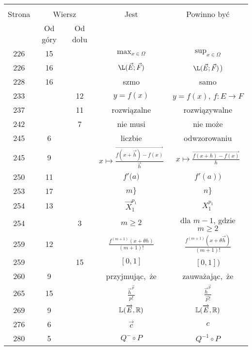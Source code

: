 \documentclass[a4paper,11pt]{article}
\begin{document}
\begin{center}

  \begin{tabular}{|c|c|c|c|c|}
    \hline
    & \multicolumn{2}{c|}{} & & \\
    Strona & \multicolumn{2}{c|}{Wiersz} & Jest
                              & Powinno być \\ \cline{2-3}
    & Od góry & Od dołu & & \\
    \hline
    226 & 15 & & $\max_{ x \in \Omega }$ & $\sup_{ x \in \Omega }$ \\
    226 & 16 & & $\L( \vec{ E }; \vec{ F } )$
           & $\L( \vec{ E }; \vec{ F } )$) \\
    228 & 16 & & szmo & samo \\
    233 & & 12 & $y = f( x )$ & $y = f( x )$, $f : E \to F$ \\
    237 & & 11 & rozwiązalne & rozwiązywalne \\
    242 & &  7 & nie musi & nie może \\
    245 &  6 & & liczbie & odwzorowaniu \\
    245 &  9 & & $x \mapsto
                 \frac{ \overrightarrow{ f( x + \vec{ h } ) - f( x ) } }{ \vec{ h } }$
           & $x \mapsto \frac{ \overrightarrow{ f( x + h ) - f( x ) } }{ h }$ \\
    250 & 11 & & $f'( a \Big)$ & $f'( a ) \Big)$ \\
    253 & 17 & & $m \}$ & $n \}$ \\
    254 & 13 & & $\vec{ X }^{ p_{ 1 } }_{ 1 }$ & $X^{ p_{ 1 } }_{ 1 }$ \\
    254 & &  3 & $m \geq 2$ & dla $m - 1$, gdzie $m \geq 2$ \\
    259 & 12 & & $\frac{ f^{ ( m + 1 ) }( x + \theta h ) }{ ( m + 1 )! }$
           & $\frac{ f^{ ( m + 1 ) }( x + \theta \vec{ h } ) }{ ( m + 1 )! }$
    \\
    259 & & 15 & $[ 0, 1 ]$ & $[ 0, 1 ]$) \\
    260 &  9 & & przyjmując,~że & zauważając,~że \\
    265 & 15 & & $\frac{ \vec{ h }^{ \vec{ p } } }{ p! }$
           & $\frac{ \vec{ h }^{ \vec{ p } } }{ \vec{ p }! }$ \\
    269 &  9 & & $\mathbb{L}( \overrightarrow{ E }, \mathbb{R} )$
           & $\mathbb{L}( \overrightarrow{ E }, \mathbb{R} )$ \\
    276 &  6 & & $\vec{ c }$ & $c$ \\
    280 &  5 & & $Q^{ - } \circ P$ & $Q^{ -1 } \circ P$ \\

\end{tabular}
\end{center}
\end{document}
